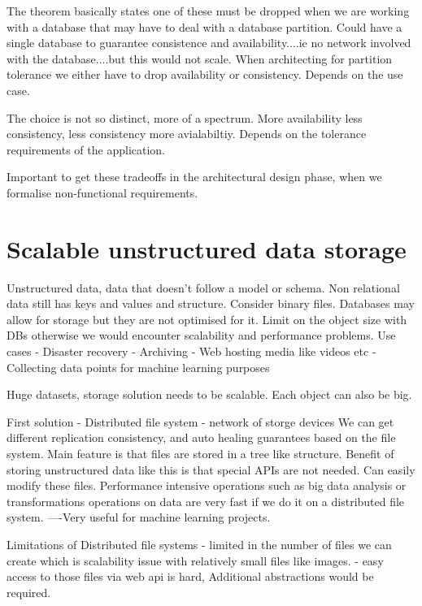 \documentclass[a4paper, 11pt]{book}
\begin{document}
    The theorem basically states one of these must be dropped when we are working with a database that may have to deal with a database partition.
    Could have a single database to guarantee consistence and availability....ie no network involved with the database....but this would not scale.
    When architecting for partition tolerance we either have to drop availability or consistency.
    Depends on the use case.

    The choice is not so distinct, more of a spectrum.
    More availability less consistency, less consistency more avialabiltiy. Depends on the tolerance requirements of the application.

    Important to get these tradeoffs in the architectural design phase, when we formalise non-functional requirements.


    \section{Scalable unstructured data storage}
    Unstructured data, data that doesn't follow a model or schema. Non relational data still has keys and values and structure.
    Consider binary files.
    Databases may allow for storage but they are not optimised for it.
    Limit on the object size with DBs otherwise we would encounter scalability and performance problems.
    Use cases
    - Disaster recovery
    - Archiving
    - Web hosting media like videos etc
    - Collecting data points for machine learning purposes

    Huge datasets, storage solution needs to be scalable.
    Each object can also be big.

    First solution - Distributed file system - network of storge devices
    We can get different replication consistency, and auto healing guarantees based on the file system.
    Main feature is that files are stored in a tree like structure.
    Benefit of storing unstructured data like this is that special APIs are not needed.
    Can easily modify these files.
    Performance intensive operations such as big data analysis or transformations operations on data are very fast if we do it on a distributed file system.
    ----Very useful for machine learning projects.

    Limitations of Distributed file systems
    - limited in the number of files we can create which is scalability issue with relatively small files like images.
    - easy access to those files via web api is hard, Additional abstractions would be required.
\end{document}
